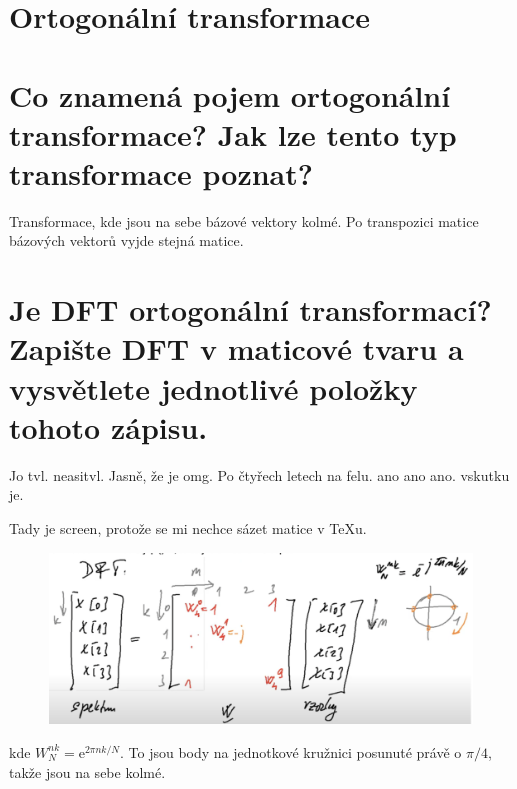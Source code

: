 \documentclass[a4paper,12pt]{article}   %
\newcommand{\mt}[1]{$#1$}
\newcommand{\e}{\text{e}}
\begin{document}
\clearpage 

\section*{Ortogonální transformace}
\section{Co znamená pojem ortogonální transformace? Jak lze tento typ transformace poznat?}
Transformace, kde jsou na sebe bázové vektory kolmé.
Po transpozici matice bázových vektorů vyjde stejná matice. 


\section{Je DFT ortogonální transformací? Zapište DFT v maticové tvaru a vysvětlete jednotlivé položky tohoto zápisu.}
Jo tvl. neasitvl. Jasně, že je omg. Po čtyřech letech na felu. ano ano ano. vskutku je.

Tady je screen, protože se mi nechce sázet matice v TeXu.
\begin{figure}[h!]
        \centering
        \includegraphics[width=.6\textwidth]{fig/DFT_matrix.png}
\end{figure}
kde \mt{W_N^{nk} = \e^{2\pi n k/N}}. To jsou body na jednotkové kružnici posunuté právě o \mt{\pi/4}, takže jsou na sebe kolmé. 

\begin{center}
        \Ladiesroom~~\Ladiesroom~~\Ladiesroom~~\Ladiesroom~~\Ladiesroom~~\Ladiesroom~~\Ladiesroom~~\Ladiesroom~~\Ladiesroom~~\Ladiesroom~~\Ladiesroom~~\Ladiesroom~~\Ladiesroom~~\Ladiesroom~~\Ladiesroom~~\Ladiesroom~~\Ladiesroom~~\Ladiesroom~~\Ladiesroom~~\Ladiesroom~~\Ladiesroom~~\Ladiesroom~~\Ladiesroom~~\Ladiesroom~~\Ladiesroom~~\Ladiesroom~~\Ladiesroom~~\Ladiesroom~~\Ladiesroom~~\Ladiesroom~~\Ladiesroom~~\Ladiesroom~~\Ladiesroom~~\Ladiesroom~~\Ladiesroom~~\Ladiesroom~~\Ladiesroom~~\Ladiesroom~~\Ladiesroom~~\Ladiesroom~~\Ladiesroom~~\Ladiesroom~~\Ladiesroom~~\Ladiesroom~~\Ladiesroom
\end{center}
        \FloatBarrier
\end{document}
